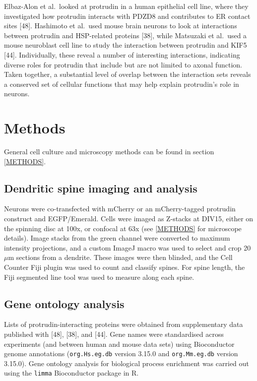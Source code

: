 \documentclass[
  12pt,
  a4paper,
]{book}
\begin{document}
Elbaz-Alon et al.~looked at protrudin in a human epithelial cell line, where they investigated how protrudin interacts with PDZD8 and contributes to ER contact sites {[}48{]}. Hashimoto et al.~used mouse brain neurons to look at interactions between protrudin and HSP-related proteins {[}38{]}, while Matsuzaki et al.~used a mouse neuroblast cell line to study the interaction between protrudin and KIF5 {[}44{]}. Individually, these reveal a number of interesting interactions, indicating diverse roles for protrudin that include but are not limited to axonal function. Taken together, a substantial level of overlap between the interaction sets reveals a conserved set of cellular functions that may help explain protrudin's role in neurons.

\hypertarget{methods-1}{%
\section{Methods}\label{methods-1}}

General cell culture and microscopy methods can be found in section \ref{METHODS}.

\hypertarget{dendritic-spine-imaging-and-analysis}{%
\subsection{Dendritic spine imaging and analysis}\label{dendritic-spine-imaging-and-analysis}}

Neurons were co-transfected with mCherry or an mCherry-tagged protrudin construct and EGFP/Emerald. Cells were imaged as Z-stacks at DIV15, either on the spinning disc at 100x, or confocal at 63x (see \ref{METHODS} for microscope details). Image stacks from the green channel were converted to maximum intensity projections, and a custom ImageJ macro was used to select and crop 20\(\mu\)m sections from a dendrite. These images were then blinded, and the Cell Counter Fiji plugin was used to count and classify spines. For spine length, the Fiji segmented line tool was used to measure along each spine.

\hypertarget{gene-ontology-analysis}{%
\subsection{Gene ontology analysis}\label{gene-ontology-analysis}}

Lists of protrudin-interacting proteins were obtained from supplementary data published with {[}48{]}, {[}38{]}, and {[}44{]}. Gene names were standardised across experiments (and between human and mouse data sets) using Bioconductor genome annotations (\texttt{org.Hs.eg.db} version 3.15.0 and \texttt{org.Mm.eg.db} version 3.15.0). Gene ontology analysis for biological process enrichment was carried out using the \texttt{limma} Bioconductor package in R.
\end{document}

